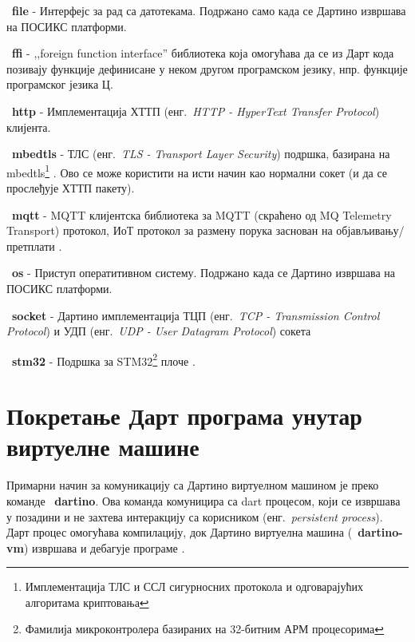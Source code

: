\documentclass[12pt,oneside]{memoir}
\begin{document}
\begin{description}

\item ~\textbf{file} - Интерфејс за рад са датотекама. Подржано само када се Дартино извршава на ПОСИКС платформи.

\item ~\textbf{ffi} - ,,foreign function interface'' библиотека која омогућава да се из Дарт кода позивају функције дефинисане у неком другом програмском језику, нпр. функције програмског језика Ц.

\item ~\textbf{http} - Имплементација ХТТП (енг.~\textit{HTTP - HyperText Transfer Protocol}) клијента.

\item ~\textbf{mbedtls} - ТЛС (енг.~\textit{TLS - Transport Layer Security}) подршка, базирана на mbedtls\footnote{ Имплементација ТЛС и ССЛ сигурносних протокола и одговарајућих алгоритама криптовања} \cite{mbed}.
Ово се може користити на исти начин као нормални сокет (и да се прослеђује ХТТП пакету).

\item ~\textbf{mqtt} - MQTT клијентска библиотека за MQTT (скраћено од MQ Telemetry Transport) протокол, ИоТ протокол за размену порука заснован на објављивању/претплати \cite{mqtt}.

\item ~\textbf{os} - Приступ оператитивном систему. Подржано када се Дартино извршава на ПОСИКС платформи.

\item ~\textbf{socket} - Дартино имплементација ТЦП (енг.~\textit{TCP - Transmission Control Protocol}) и УДП (енг.~\textit{UDP - User Datagram Protocol}) сокета

\item ~\textbf{stm32} - Подршка за STM32\footnote{Фамилија микроконтролера базираних на 32-битним АРМ процесорима} плоче \cite{smt32}.

\end{description}

\section{Покретање Дарт програма унутар виртуелне машине}
\label{sec:pokretanje}

Примарни начин за комуникацију са Дартино виртуелном машином је преко команде ~\textbf{dartino}. Ова команда комуницира са dart процесом, који се извршава у позадини и не захтева интеракцију са корисником (енг.~\textit{persistent process}). Дарт процес омогућава компилацију, док Дартино виртуелна машина (~\textbf{dartino-vm}) извршава и дебагује програме .\\
\end{document}
